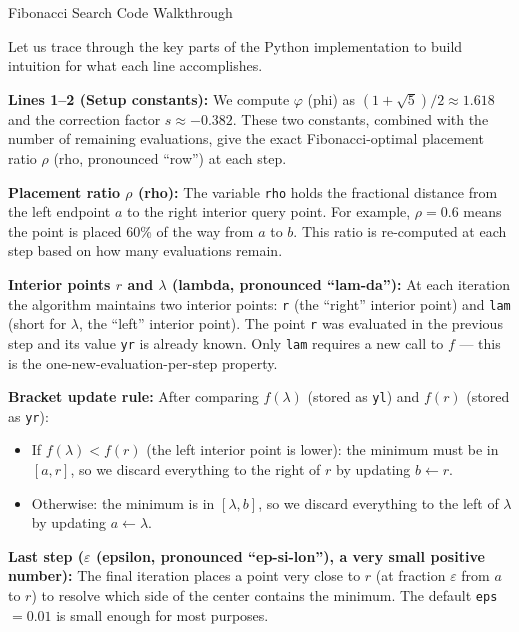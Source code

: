 \documentclass[aspectratio=169,10pt]{beamer}
\begin{document}
\begin{frame}[allowframebreaks]{Fibonacci Search Code Walkthrough}

  Let us trace through the key parts of the Python implementation to build
  intuition for what each line accomplishes.

  \textbf{Lines 1--2 (Setup constants):} We compute $\varphi$ (phi) as
  $(1 + \sqrt{5})/2 \approx 1.618$ and the correction factor $s \approx -0.382$.
  These two constants, combined with the number of remaining evaluations, give
  the exact Fibonacci-optimal placement ratio $\rho$ (rho, pronounced ``row'')
  at each step.

  \textbf{Placement ratio $\rho$ (rho):} The variable \texttt{rho} holds the
  fractional distance from the left endpoint $a$ to the right interior query
  point.  For example, $\rho = 0.6$ means the point is placed 60\% of the way
  from $a$ to $b$.  This ratio is re-computed at each step based on how many
  evaluations remain.

  \textbf{Interior points $r$ and $\lambda$ (lambda, pronounced ``lam-da''):}
  At each iteration the algorithm maintains two interior points: \texttt{r}
  (the ``right'' interior point) and \texttt{lam} (short for $\lambda$, the
  ``left'' interior point).  The point \texttt{r} was evaluated in the previous
  step and its value \texttt{yr} is already known.  Only \texttt{lam} requires
  a new call to $f$ --- this is the one-new-evaluation-per-step property.

  \textbf{Bracket update rule:}
  After comparing $f(\lambda)$ (stored as \texttt{yl}) and $f(r)$ (stored as
  \texttt{yr}):
  \begin{itemize}
    \item If $f(\lambda) < f(r)$ (the left interior point is lower): the minimum
          must be in $[a, r]$, so we discard everything to the right of $r$
          by updating $b \leftarrow r$.
    \item Otherwise: the minimum is in $[\lambda, b]$, so we discard everything
          to the left of $\lambda$ by updating $a \leftarrow \lambda$.
  \end{itemize}

  \textbf{Last step ($\varepsilon$ (epsilon, pronounced ``ep-si-lon''), a very
  small positive number):} The final iteration places a point very close to
  $r$ (at fraction $\varepsilon$ from $a$ to $r$) to resolve which side of the
  center contains the minimum.  The default \texttt{eps} $= 0.01$ is small
  enough for most purposes.

\end{frame}
\end{document}
